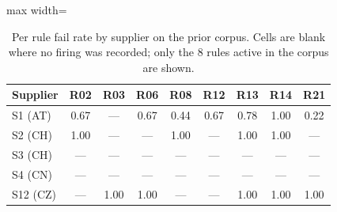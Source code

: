 \begin{table}[htbp]
\centering
\caption{Per rule fail rate by supplier on the prior corpus. Cells are blank where no firing was recorded; only the 8 rules active in the corpus are shown.}
\label{tab:app:perrule}
\footnotesize
\begin{adjustbox}{max width=\textwidth}
\begin{tabular}{@{}lcccccccc@{}}
\toprule
\textbf{Supplier} & \textbf{R02} & \textbf{R03} & \textbf{R06} & \textbf{R08} & \textbf{R12} & \textbf{R13} & \textbf{R14} & \textbf{R21} \\
\midrule
S1 (AT)  & 0.67 & ---  & 0.67 & 0.44 & 0.67 & 0.78 & 1.00 & 0.22 \\
S2 (CH)  & 1.00 & ---  & ---  & 1.00 & ---  & 1.00 & 1.00 & ---  \\
S3 (CH)  & ---  & ---  & ---  & ---  & ---  & ---  & ---  & ---  \\
S4 (CN)  & ---  & ---  & ---  & ---  & ---  & ---  & ---  & ---  \\
S12 (CZ) & ---  & 1.00 & 1.00 & ---  & ---  & 1.00 & 1.00 & 1.00 \\
\bottomrule
\end{tabular}
\end{adjustbox}
\end{table}

